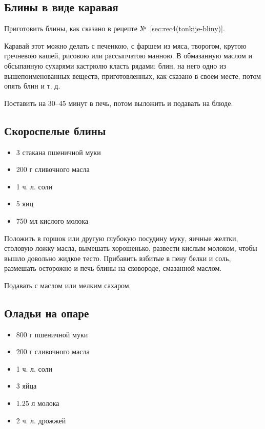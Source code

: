 \subsection{Блины в виде каравая}

Приготовить блины, как сказано в рецепте №~\ref{sec:rec4(tonkije-bliny)}.

Каравай этот можно делать с печенкою, с фаршем из мяса, творогом, крутою гречневою кашей, рисовою или рассыпчатою манною. В обмазанную маслом и обсыпанную сухарями кастрюлю класть рядами: блин, на него одно из вышепоименованных веществ, приготовленных, как сказано в своем месте, потом опять блин и т. д.

Поставить на 30–45 минут в печь, потом выложить и подавать на блюде.

\subsection{Скороспелые блины}

\begin{itemize}
	\item 3 стакана пшеничной муки 
    \item 200 г сливочного масла 
    \item 1 ч. л. соли 
    \item 5 яиц 
    \item 750 мл кислого молока
\end{itemize}

Положить в горшок или другую глубокую посудину муку, яичные желтки, столовую ложку масла, вымешать хорошенько, развести кислым молоком, чтобы вышло довольно жидкое тесто. Прибавить взбитые в пену белки и соль, размешать осторожно и печь блины на сковороде, смазанной маслом.

Подавать с маслом или мелким сахаром.

\subsection{Оладьи на опаре}

\begin{itemize}
	\item 800 г пшеничной муки
    \item 200 г сливочного масла
    \item 1 ч. л. соли 
    \item 3 яйца
    \item 1.25 л молока 
    \item 2 ч. л. дрожжей
\end{itemize}

